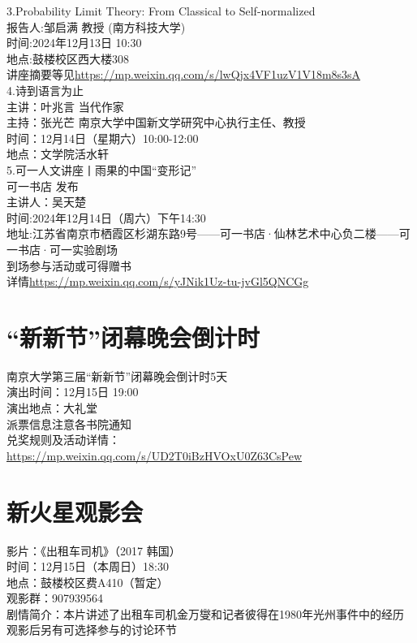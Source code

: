 \documentclass[letterpaper, 12pt]{article}
\begin{document}
\begin{multicols}{2}
3.Probability Limit Theory: From Classical to Self-normalized\\
报告人:邹启满 教授 (南方科技大学)\\
时间:2024年12月13日 10:30\\
地点:鼓楼校区西大楼308\\
讲座摘要等见\url{https://mp.weixin.qq.com/s/lwQjx4VF1uzV1V18m8s3sA}\\

4.诗到语言为止\\
主讲：叶兆言 当代作家\\
主持：张光芒 南京大学中国新文学研究中心执行主任、教授\\
时间：12月14日（星期六）10:00-12:00\\
地点：文学院活水轩\\

5.可一人文讲座丨雨果的中国“变形记”\\
可一书店 发布\\
主讲人：吴天楚\\
时间:2024年12月14日（周六）下午14:30\\
地址:江苏省南京市栖霞区杉湖东路9号——可一书店·仙林艺术中心负二楼——可一书店·可一实验剧场\\
到场参与活动或可得赠书\\
详情\url{https://mp.weixin.qq.com/s/yJNik1Uz-tu-jvGl5QNCGg}
\section{“新新节”闭幕晚会倒计时}
南京大学第三届“新新节”闭幕晚会倒计时5天\\
演出时间：12月15日 19:00\\
演出地点：大礼堂\\
派票信息注意各书院通知\\
兑奖规则及活动详情：\url{https://mp.weixin.qq.com/s/UD2T0iBzHVOxU0Z63CsPew}


\section{新火星观影会}
影片：《出租车司机》（2017 韩国）\\
时间：12月15日（本周日）18:30\\
地点：鼓楼校区费A410（暂定）\\
观影群：907939564\\
剧情简介：本片讲述了出租车司机金万燮和记者彼得在1980年光州事件中的经历\\
观影后另有可选择参与的讨论环节


\end{multicols}
\end{document}

